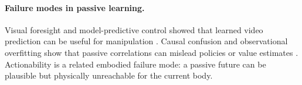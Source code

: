 \paragraph{Failure modes in passive learning.}
Visual foresight and model-predictive control showed that learned video prediction can be useful for manipulation \citep{finn2017foresight}. Causal confusion and observational overfitting show that passive correlations can mislead policies or value estimates \citep{dehaan2019causal,song2019observational}. Actionability is a related embodied failure mode: a passive future can be plausible but physically unreachable for the current body.
